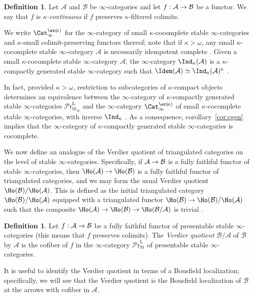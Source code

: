 \documentclass{amsart}
\renewcommand{\to}{\mathchoice{\longrightarrow}{\rightarrow}{\rightarrow}{\rightarrow}}
\let\catsymbfont\mathcal
\newcommand{\aA}{{\catsymbfont{A}}}
\newcommand{\aB}{{\catsymbfont{B}}}
\newcommand{\kstabcat}{\Cat_\i^{\ex(\!\kappa)}}
\newcommand{\stabprcat}{{{\mathcal{P}\mathrm{r}}^{\mathrm{L}}_\mathrm{St}}}
\renewcommand{\i}{\infty}
\numberwithin{equation}{section}
\theoremstyle{definition}
\newtheorem{definition}[equation]{Definition}
\begin{document}
\begin{definition}
Let $\aA$ and $\aB$ be $\i$-categories and let $f:\aA\to\aB$ be a
functor.  We say that $f$ is {\em $\kappa$-continuous} if $f$
preserves $\kappa$-filtered colimits. 
\end{definition}

We write $\kstabcat$ for the $\i$-category of small
$\kappa$-cocomplete stable $\i$-categories and $\kappa$-small
colimit-preserving functors 
thereof; note that if $\kappa>\omega$, any small $\kappa$-cocomplete
stable $\i$-category $\aA$ is necessarily idempotent
complete \cite[5.4.2.4]{HTT}.  Given a small $\kappa$-cocomplete
stable $\i$-category $\aA$, the $\i$-category $\Ind_\kappa(\aA)$ is a
$\kappa$-compactly generated stable $\i$-category such that
$\Idem(\aA) \simeq\Ind_\kappa(\aA)^\kappa$ \cite[5.5.7.8,
5.5.7.10]{HTT}.

In fact, provided $\kappa>\omega$, restriction to subcategories of
$\kappa$-compact objects determines an equivalence between the
$\i$-category of $\kappa$-compactly generated stable $\i$-categories
$\stabprcat_\kappa$ and the $\i$-category $\kstabcat$ of small
$\kappa$-cocomplete stable $\i$-categories, with inverse
$\Ind_\kappa$ \cite[5.5.7.10]{HTT}.  As a consequence,
corollary~\ref{cor:cgen} implies that the $\i$-category of
$\kappa$-compactly generated stable $\i$-categories is cocomplete.

We now define an analogue of the Verdier quotient of triangulated
categories on the level of stable $\i$-categories.  Specifically, if
$\aA\to\aB$ is a fully faithful functor of stable $\infty$-categories,
then $\Ho(\aA)\to\Ho(\aB)$ is a fully faithful functor of triangulated
categories, and we may form the usual Verdier quotient
$\Ho(\aB)/\Ho(\aA)$.  This is defined as the initial triangulated
category $\Ho(\aB)/\Ho(\aA)$ equipped with a triangulated functor
$\Ho(\aB)\to\Ho(\aB)/\Ho(\aA)$ such that the composite
$\Ho(\aA)\to\Ho(\aB)\to\Ho(\aB/\aA)$ is trivial \cite[2.1.8]{Neeman}.

\begin{definition}\label{defn:verdquot}
Let $f:\aA\to\aB$ be a fully faithful functor of presentable stable
$\infty$-categories (this means that $f$ preserves colimits).  The
{\em Verdier quotient} $\aB/\aA$ of $\aB$ by $\aA$ is the cofiber of
$f$ in the $\infty$-category $\stabprcat$ of presentable stable
$\i$-categories.
\end{definition}

It is useful to identify the Verdier quotient in terms of a Bousfield
localization; specifically, we will see that the Verdier quotient is
the Bousfield localization of $\aB$ at the arrows with cofiber in
$\aA$.
\end{document}
